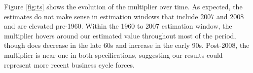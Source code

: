 Figure \ref{fig:ts} shows the evolution of the multiplier over time. As expected, the estimates do not make sense in estimation windows that include 2007 and 2008 and are elevated pre-1960. Within the 1960 to 2007 estimation window, the multiplier hovers around our estimated value throughout most of the period, though does decrease in the late 60s and increase in the early 90s. Post-2008, the multiplier is near one in both specifications, suggesting our results could represent more recent business cycle forces. 
